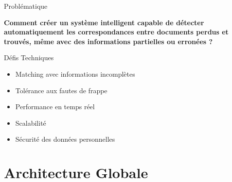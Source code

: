 \documentclass[aspectratio=169]{beamer}
\begin{document}
\begin{frame}{Problématique}
    \begin{center}
        \Large
        \textbf{Comment créer un système intelligent capable de détecter automatiquement les correspondances entre documents perdus et trouvés, même avec des informations partielles ou erronées ?}
    \end{center}

    \vspace{1cm}

    \begin{block}{Défis Techniques}
        \begin{itemize}
            \item Matching avec informations incomplètes
            \item Tolérance aux fautes de frappe
            \item Performance en temps réel
            \item Scalabilité
            \item Sécurité des données personnelles
        \end{itemize}
    \end{block}
\end{frame}

\section{Architecture Globale}
\end{document}
